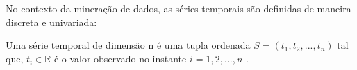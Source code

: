 No contexto da mineração de dados, as séries temporais são definidas de maneira
discreta e univariada:

\begin{definition}
	Uma série temporal de dimensão n é uma tupla ordenada
	$S = \left(t_1, t_2, ..., t_n\right)$
	tal que, $t_i \in \mathbb{R}$ é o valor observado no instante
	$i = 1, 2, ..., n$ \cite{Esling2012}.
\end{definition}
